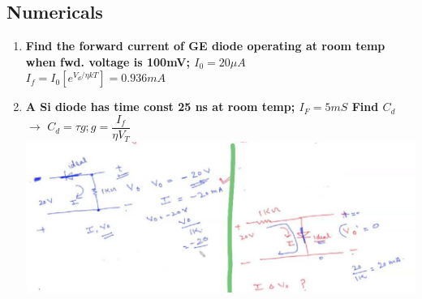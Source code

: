 \documentclass[10pt, a4paper]{report}
\begin{document}
	\subsection{Numericals}
	\begin{enumerate}
		\item \textbf{Find the forward current of GE diode operating at room temp when fwd. voltage is 100mV; $ I_0 = 20\mu A $ }\\
		$ I_f = I_0[ e^{V_d/\eta k T}]  = 0.936mA$
		\item \textbf{A Si diode has time const 25 ns at room temp; $ I_F = 5mS $ Find $ C_d $} \\
		$\rightarrow$ $ C_d = \tau g; g = \dfrac{I_f}{\eta V_T} $
		\includegraphics[width=\linewidth]{img/numericals 2nd jan}
	\end{enumerate}
\end{document}
